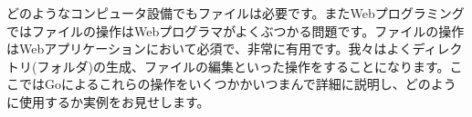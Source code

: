 どのようなコンピュータ設備でもファイルは必要です。またWebプログラミングではファイルの操作はWebプログラマがよくぶつかる問題です。ファイルの操作はWebアプリケーションにおいて必須で、非常に有用です。我々はよくディレクトリ(フォルダ)の生成、ファイルの編集といった操作をすることになります。ここではGoによるこれらの操作をいくつかかいつまんで詳細に説明し、どのように使用するか実例をお見せします。
